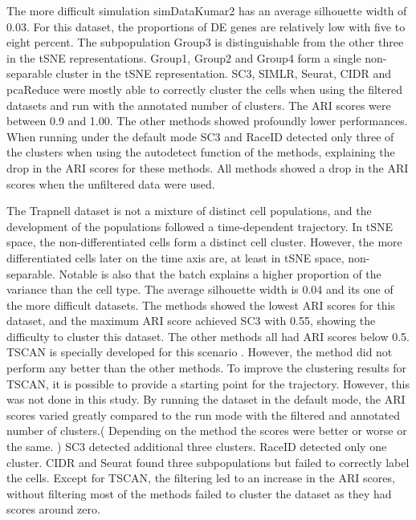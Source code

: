 \documentclass[12pt, a4paper]{article}\usepackage[]{graphicx}\usepackage[]{color}
\begin{document}
The more difficult simulation simDataKumar2 has an average silhouette width of 0.03. For this dataset, the proportions of DE genes are relatively low with five to eight percent. The subpopulation Group3 is distinguishable from the other three in the tSNE representations. Group1, Group2 and Group4 form a single non-separable cluster in the tSNE representation.  SC3, SIMLR, Seurat, CIDR and pcaReduce were mostly able to correctly cluster the cells when using the filtered datasets and run with the annotated number of clusters. The ARI scores were between 0.9 and 1.00. The other methods showed profoundly lower performances.  When running under the default mode SC3 and RaceID detected only three of the clusters when using the autodetect function of the methods, explaining the drop in the ARI scores for these methods. All methods showed a drop in the ARI scores when the unfiltered data were used.

The Trapnell dataset is not a mixture of distinct cell populations, and the development of the populations followed a time-dependent trajectory. In tSNE space, the non-differentiated cells form a distinct cell cluster. However, the more differentiated cells later on the time axis are, at least in tSNE space, non-separable. Notable is also that the batch explains a higher proportion of the variance than the cell type.  The average silhouette width is 0.04 and its one of the more difficult datasets.
 The methods showed the lowest ARI scores for this dataset, and the maximum ARI score achieved  SC3 with 0.55, showing the difficulty to cluster this dataset. The other methods all had ARI scores below 0.5. TSCAN is specially developed for this scenario \citep{ji2015tscan}. However, the method did not perform any better than the other methods. To improve the clustering results for TSCAN, it is possible to provide a starting point for the trajectory. However, this was not done in this study. By running the dataset in the default mode, the ARI scores varied greatly compared to the run mode with the filtered and annotated number of clusters.( Depending on the method the scores were better or worse or the same. ) SC3 detected additional three clusters. RaceID detected only one cluster. CIDR and Seurat found three subpopulations but failed to correctly label the cells. Except for TSCAN, the filtering led to an increase in the ARI scores, without filtering most of the methods failed to cluster the dataset as they had scores around zero.
\end{document}
